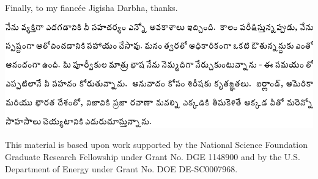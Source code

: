 Finally, to my fiancée Jigisha Darbha, thanks. %

\vspace{12pt}
\noindent
\includegraphics[width=1.0\textwidth]{telugu/thanks.pdf}
%


\newpage

This material is based upon work supported by the National Science Foundation
Graduate Research Fellowship under Grant No. DGE 1148900
and by the U.S. Department of Energy under Grant No. DOE DE-SC0007968.
